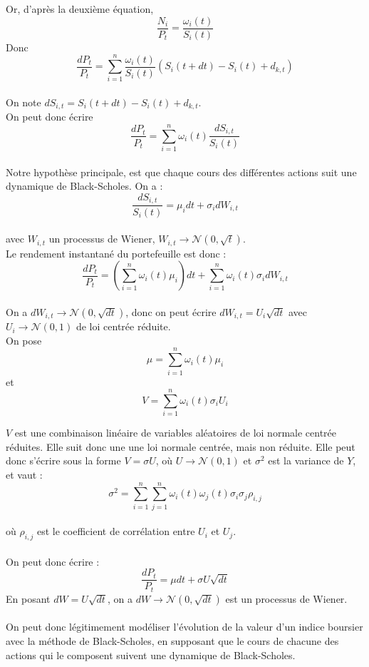 \documentclass[french,12pt,a4paper]{article}
\begin{document}
Or, d'après la deuxième équation,
$$ \frac{N_i}{P_t} = \frac{\omega_i(t)}{S_i(t)} $$
Donc
$$ \frac{dP_t}{P_t} = \sum_{i=1}^n\frac{\omega_i(t)}{S_i(t)}(S_i(t+dt)-S_i(t) + d_{k,t}) $$
\\
On note $ dS_{i,t} = S_i(t+dt)-S_i(t)+d_{k,t} $. \\
On peut donc écrire
$$ \frac{dP_t}{P_t} = \sum_{i=1}^n\omega_i(t)\frac{dS_{i,t}}{S_i(t)} $$
\\
Notre hypothèse principale, est que chaque cours des différentes actions suit une dynamique de Black-Scholes. On a  :
$$ \frac{dS_{i,t}}{S_i(t)} = \mu_idt + \sigma_i dW_{i,t} $$  \\
avec $W_{i,t}$ un processus de Wiener, $ W_{i,t} \rightarrow \mathcal{N}(0,\sqrt{t})$.\\

Le rendement instantané du portefeuille est donc :
$$ \frac{dP_t}{P_t} = (\sum_{i=1}^n\omega_i(t)\mu_i)dt + \sum_{i=1}^n\omega_i(t)\sigma_idW_{i,t} $$ \\
On a $ dW_{i,t} \rightarrow \mathcal{N}(0,\sqrt{dt})$, donc on peut écrire $dW_{i,t} = U_i\sqrt{dt}$ avec $U_i \rightarrow \mathcal{N}(0,1)$ de loi centrée réduite. \\
On pose
$$\mu = \sum_{i=1}^n\omega_i(t)\mu_i$$ et $$V = \sum_{i=1}^n\omega_i(t)\sigma_iU_i$$

$V$ est une combinaison linéaire de variables aléatoires de loi normale centrée réduites. Elle suit donc une une loi normale centrée, mais non réduite. Elle peut donc s'écrire sous la forme $V = \sigma U$, où $U \rightarrow \mathcal{N}(0,1)$ et $\sigma^2$ est la variance de $Y$, et vaut :
$$\sigma^2 = \sum_{i=1}^n\sum_{j=1}^n\omega_i(t)\omega_j(t)\sigma_i\sigma_j\rho_{i,j} $$ \\
où $\rho_{i,j}$ est le coefficient de corrélation entre $U_i$ et $U_j$. \\\\
On peut donc écrire :
$$ \frac{dP_t}{P_t} = \mu dt + \sigma U \sqrt{dt} $$
En posant $dW = U \sqrt{dt}$, on a $dW \rightarrow \mathcal{N}(0,\sqrt{dt})$ est un processus de Wiener. \\ \\
On peut donc légitimement modéliser l'évolution de la valeur d'un indice boursier avec la méthode de Black-Scholes, en supposant que le cours de chacune des actions qui le composent suivent une dynamique de Black-Scholes.
\end{document}
